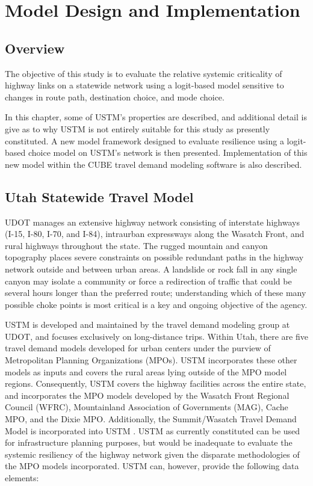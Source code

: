 \chapter{Model Design and Implementation}
\label{chp:chapter3}
\graphicspath{{figures/}{figures/chapter3/}}

\section{Overview} \label{Overview}

The objective of this study is to evaluate the relative systemic
criticality of highway links on a statewide network using a logit-based model
sensitive to changes in route path, destination choice, and mode choice.

In this chapter, some of USTM's properties are described, and additional detail is give as to why
USTM is not entirely suitable for this study as presently constituted. A new
model framework designed to evaluate resilience using a logit-based choice model on
USTM's network is then presented. Implementation of this new model within the CUBE travel demand
modeling software is also described.

\section{Utah Statewide Travel Model} \label{Utah Statewide Travel Model}

UDOT manages an extensive highway
network consisting of interstate highways (I-15, I-80, I-70, and I-84),
intraurban expressways along the Wasatch Front, and rural highways throughout
the state. The rugged mountain and canyon topography places
severe constraints on possible redundant paths in the highway network outside and between urban areas. A
landslide or rock fall in any single canyon may isolate a community or force a
redirection of traffic that could be several hours longer than the preferred
route; understanding which of these many possible choke points is most
critical is a key and ongoing objective of the agency.

USTM is developed and maintained by
the travel demand modeling group at UDOT, and focuses exclusively on
long-distance trips. Within Utah, there are five travel
demand models developed for urban centers under the purview of  Metropolitan
Planning Organizations (MPOs). USTM incorporates these other models as inputs and covers
the rural areas lying outside of the MPO model regions. Consequently, USTM covers the
highway facilities across the entire state, and incorporates the MPO models
developed by the Wasatch Front Regional Council (WFRC), Mountainland
Association of Governments (MAG), Cache MPO, and the Dixie MPO. Additionally,
the Summit/Wasatch Travel Demand Model is incorporated into USTM \citep{udot2021}.
USTM as currently
constituted can be used for infrastructure planning purposes, but would be
inadequate to evaluate the systemic resiliency of the highway network given
the disparate methodologies of the MPO models incorporated. USTM can, however, provide the
following data elements:


